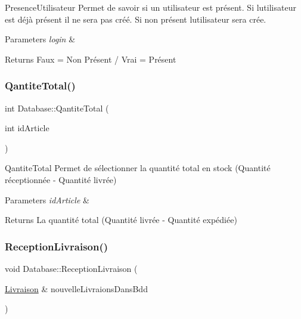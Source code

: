 Presence\+Utilisateur Permet de savoir si un utilisateur est présent. Si l\textquotesingle{}utilisateur est déjà présent il ne sera pas créé. Si non présent l\textquotesingle{}utilisateur sera crée. 


\begin{DoxyParams}{Parameters}
{\em login} & \\
\hline
\end{DoxyParams}
\begin{DoxyReturn}{Returns}
Faux = Non Présent / Vrai = Présent 
\end{DoxyReturn}
\mbox{\label{class_database_a4dcaf727e1e1c241b6f89d398e16c69a}} 
\subsubsection{\texorpdfstring{Qantite\+Total()}{QantiteTotal()}}
{\footnotesize\ttfamily int Database\+::\+Qantite\+Total (\begin{DoxyParamCaption}\item[{int}]{id\+Article }\end{DoxyParamCaption})}



Qantite\+Total Permet de sélectionner la quantité total en stock (Quantité réceptionnée -\/ Quantité livrée) 


\begin{DoxyParams}{Parameters}
{\em id\+Article} & \\
\hline
\end{DoxyParams}
\begin{DoxyReturn}{Returns}
La quantité total (Quantité livrée -\/ Quantité expédiée) 
\end{DoxyReturn}
\mbox{\label{class_database_a0c0cd5c7401905883258019cdd18f6bd}} 
\subsubsection{\texorpdfstring{Reception\+Livraison()}{ReceptionLivraison()}}
{\footnotesize\ttfamily void Database\+::\+Reception\+Livraison (\begin{DoxyParamCaption}\item[{\mbox{\hyperlink{class_livraison}{Livraison}} \&}]{nouvelle\+Livraions\+Dans\+Bdd }\end{DoxyParamCaption})}



